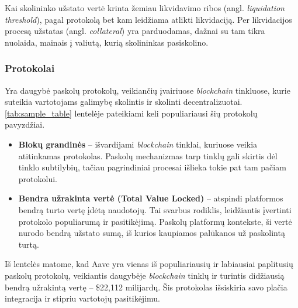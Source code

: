 \documentclass[]{VUMIFTemplateClass}
\begin{document}
Kai skolininko užstato vertė krinta žemiau likvidavimo ribos (angl. \textit{liquidation threshold}), pagal protokolą bet kam leidžiama atlikti likvidaciją. Per likvidacijos procesą užstatas (angl. \textit{collateral}) yra parduodamas, dažnai su tam tikra nuolaida, mainais į valiutą, kurią skolininkas pasiskolino. \cite{venusliquidations}

\subsubsection{Protokolai}

Yra daugybė paskolų protokolų, veikiančių įvairiuose \textit{blockchain} tinkluose, kurie suteikia vartotojams galimybę skolintis ir skolinti decentralizuotai. \ref{tab:sample_table} lentelėje pateikiami keli populiariausi šių protokolų pavyzdžiai. 

\begin{itemize}
  \item \textbf{Blokų grandinės} – išvardijami \textit{blockchain} tinklai, kuriuose veikia atitinkamas protokolas. Paskolų mechanizmas tarp tinklų gali skirtis dėl tinklo subtilybių, tačiau pagrindiniai procesai išlieka tokie pat tam pačiam protokolui.
  \item \textbf{Bendra užrakinta vertė (Total Value Locked)} – atspindi platformos bendrą turto vertę įdėtą naudotojų. Tai svarbus rodiklis, leidžiantis įvertinti protokolo populiarumą ir pasitikėjimą. Paskolų platformų kontekste, ši vertė nurodo bendrą užstato sumą, iš kurios kaupiamos palūkanos už paskolintą turtą.
  \end{itemize}
  
Iš lentelės matome, kad Aave yra vienas iš populiariausių ir labiausiai paplitusių paskolų protokolų, veikiantis daugybėje \textit{blockchain} tinklų ir turintis didžiausią bendrą užrakintą vertę – \$22,112 milijardų. Šis protokolas išsiskiria savo plačia integracija ir stipriu vartotojų pasitikėjimu.
\end{document}

